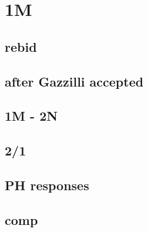 \section{1M}


\subsection{rebid}


\subsection{after Gazzilli accepted}



\subsection{1M - 2N}


\subsection{2/1}


\subsection{PH responses}


\subsection{comp}


